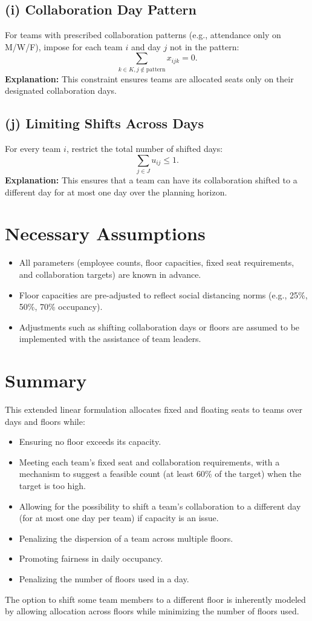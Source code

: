 \documentclass[11pt]{article}
\begin{document}
\subsection*{(i) Collaboration Day Pattern}
For teams with prescribed collaboration patterns (e.g., attendance only on M/W/F), impose for each team $i$ and day $j$ not in the pattern:
\[
\sum_{k \in K, j \notin \text{pattern}} x_{ijk} = 0.
\]
\textbf{Explanation:} This constraint ensures teams are allocated seats only on their designated collaboration days.

\subsection*{(j) Limiting Shifts Across Days}
For every team $i$, restrict the total number of shifted days:
\[
\sum_{j \in J} u_{ij} \leq 1.
\]
\textbf{Explanation:} This ensures that a team can have its collaboration shifted to a different day for at most one day over the planning horizon.

\section{Necessary Assumptions}
\begin{itemize}[leftmargin=2em]
    \item All parameters (employee counts, floor capacities, fixed seat requirements, and collaboration targets) are known in advance.
    \item Floor capacities are pre-adjusted to reflect social distancing norms (e.g., 25\%, 50\%, 70\% occupancy).
    \item Adjustments such as shifting collaboration days or floors are assumed to be implemented with the assistance of team leaders.
\end{itemize}

\section{Summary}
This extended linear formulation allocates fixed and floating seats to teams over days and floors while:
\begin{itemize}[leftmargin=2em]
    \item Ensuring no floor exceeds its capacity.
    \item Meeting each team’s fixed seat and collaboration requirements, with a mechanism to suggest a feasible count (at least 60\% of the target) when the target is too high.
    \item Allowing for the possibility to shift a team’s collaboration to a different day (for at most one day per team) if capacity is an issue.
    \item Penalizing the dispersion of a team across multiple floors.
    \item Promoting fairness in daily occupancy.
    \item Penalizing the number of floors used in a day.
\end{itemize}
The option to shift some team members to a different floor is inherently modeled by allowing allocation across floors while minimizing the number of floors used.
\end{document}
